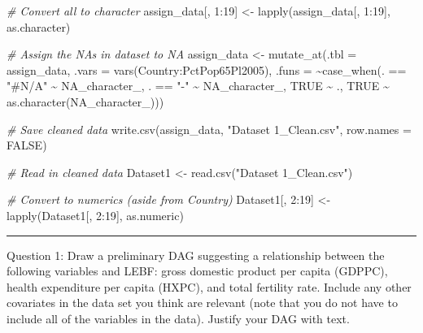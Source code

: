 \documentclass[
]{article}
\newenvironment{Shaded}{\begin{snugshade}}{\end{snugshade}}
\newcommand{\AttributeTok}[1]{\textcolor[rgb]{0.77,0.63,0.00}{#1}}
\newcommand{\CommentTok}[1]{\textcolor[rgb]{0.56,0.35,0.01}{\textit{#1}}}
\newcommand{\ConstantTok}[1]{\textcolor[rgb]{0.00,0.00,0.00}{#1}}
\newcommand{\DecValTok}[1]{\textcolor[rgb]{0.00,0.00,0.81}{#1}}
\newcommand{\FunctionTok}[1]{\textcolor[rgb]{0.00,0.00,0.00}{#1}}
\newcommand{\NormalTok}[1]{#1}
\newcommand{\OtherTok}[1]{\textcolor[rgb]{0.56,0.35,0.01}{#1}}
\newcommand{\SpecialCharTok}[1]{\textcolor[rgb]{0.00,0.00,0.00}{#1}}
\newcommand{\StringTok}[1]{\textcolor[rgb]{0.31,0.60,0.02}{#1}}
\begin{document}
\begin{Shaded}
\begin{Highlighting}[]
\CommentTok{\# Convert all to character}
\NormalTok{assign\_data[, }\DecValTok{1}\SpecialCharTok{:}\DecValTok{19}\NormalTok{] }\OtherTok{\textless{}{-}} \FunctionTok{lapply}\NormalTok{(assign\_data[, }\DecValTok{1}\SpecialCharTok{:}\DecValTok{19}\NormalTok{], as.character)}

\CommentTok{\# Assign the NAs in dataset to NA}
\NormalTok{assign\_data }\OtherTok{\textless{}{-}} \FunctionTok{mutate\_at}\NormalTok{(}\AttributeTok{.tbl =}\NormalTok{ assign\_data, }
                                \AttributeTok{.vars =} \FunctionTok{vars}\NormalTok{(Country}\SpecialCharTok{:}\NormalTok{PctPop65Pl2005), }
                                \AttributeTok{.funs =} \SpecialCharTok{\textasciitilde{}}\FunctionTok{case\_when}\NormalTok{(. }\SpecialCharTok{==} \StringTok{"\#N/A"} \SpecialCharTok{\textasciitilde{}} \ConstantTok{NA\_character\_}\NormalTok{,}
\NormalTok{                                                   . }\SpecialCharTok{==} \StringTok{"{-}"} \SpecialCharTok{\textasciitilde{}} \ConstantTok{NA\_character\_}\NormalTok{,}
                                                   \ConstantTok{TRUE} \SpecialCharTok{\textasciitilde{}}\NormalTok{ .,}
                                                   \ConstantTok{TRUE} \SpecialCharTok{\textasciitilde{}} \FunctionTok{as.character}\NormalTok{(}\ConstantTok{NA\_character\_}\NormalTok{)))}

\CommentTok{\# Save cleaned data}
\FunctionTok{write.csv}\NormalTok{(assign\_data, }\StringTok{"Dataset 1\_Clean.csv"}\NormalTok{, }\AttributeTok{row.names =} \ConstantTok{FALSE}\NormalTok{)}

\CommentTok{\# Read in cleaned data}
\NormalTok{Dataset1 }\OtherTok{\textless{}{-}} \FunctionTok{read.csv}\NormalTok{(}\StringTok{"Dataset 1\_Clean.csv"}\NormalTok{)}

\CommentTok{\# Convert to numerics (aside from Country)}
\NormalTok{Dataset1[, }\DecValTok{2}\SpecialCharTok{:}\DecValTok{19}\NormalTok{] }\OtherTok{\textless{}{-}} \FunctionTok{lapply}\NormalTok{(Dataset1[, }\DecValTok{2}\SpecialCharTok{:}\DecValTok{19}\NormalTok{], as.numeric)}
\end{Highlighting}
\end{Shaded}

\begin{center}\rule{0.5\linewidth}{0.5pt}\end{center}

Question 1: Draw a preliminary DAG suggesting a relationship between the
following variables and LEBF: gross domestic product per capita (GDPPC),
health expenditure per capita (HXPC), and total fertility rate. Include
any other covariates in the data set you think are relevant (note that
you do not have to include all of the variables in the data). Justify
your DAG with text.
\end{document}
